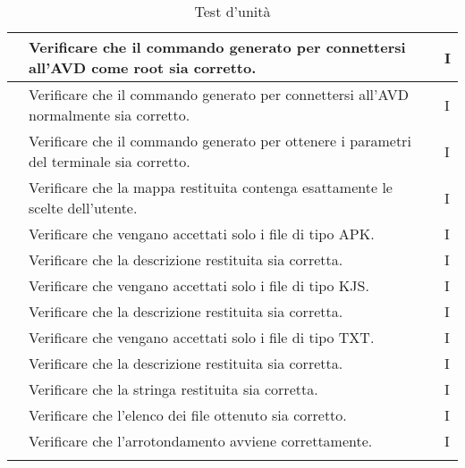 \begin{longtable}{ |C{3cm} | C{8.5cm}| C{1.5cm} |}
     & Verificare che il commando generato per connettersi all'AVD come root sia corretto.
    & I \\\hline
     & Verificare che il commando generato per connettersi all'AVD normalmente sia corretto.
    & I \\\hline
     & Verificare che il commando generato per ottenere i parametri del terminale sia corretto.
    & I \\\hline
     & Verificare che la mappa restituita contenga esattamente le scelte dell'utente.
    & I \\\hline
     & Verificare che vengano accettati solo i file di tipo APK.
    & I \\\hline
     & Verificare che la descrizione restituita sia corretta.
    & I \\\hline
     & Verificare che vengano accettati solo i file di tipo KJS.
    & I \\\hline
     & Verificare che la descrizione restituita sia corretta.
    & I \\\hline
     & Verificare che vengano accettati solo i file di tipo TXT.
    & I \\\hline
     & Verificare che la descrizione restituita sia corretta.
    & I \\\hline
     & Verificare che la stringa restituita sia corretta.
    & I \\\hline
     & Verificare che l'elenco dei file ottenuto sia corretto.
    & I \\\hline
     & Verificare che l'arrotondamento avviene correttamente.
    & I \\\hline
    \caption{Test d'unità}
\end{longtable}
\setcounter{rowcount}{0}

